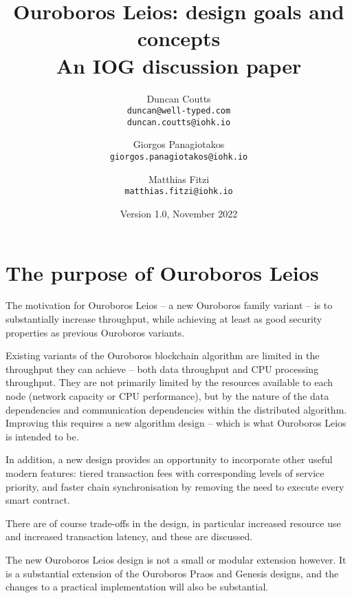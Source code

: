 \documentclass[11pt,a4paper]{article}
\begin{document}
\title{Ouroboros Leios: design goals and concepts\\
       {\large \sc An IOG discussion paper}}
\date{Version 1.0, November 2022}
\author{Duncan Coutts        \\ {\small \texttt{duncan@well-typed.com}} \\
                                {\small \texttt{duncan.coutts@iohk.io}} 
  \and  Giorgos Panagiotakos \\ {\small \texttt{giorgos.panagiotakos@iohk.io}}
  \and  Matthias Fitzi       \\ {\small \texttt{matthias.fitzi@iohk.io}}
}

\maketitle

\section*{The purpose of Ouroboros Leios}

The motivation for Ouroboros Leios -- a new Ouroboros family variant -- is to
substantially increase throughput, while achieving at least as good security
properties as previous Ouroboros variants.

Existing variants of the Ouroboros blockchain algorithm are limited in the
throughput they can achieve -- both data throughput and CPU processing
throughput. They are not primarily limited by the resources available to each
node (network capacity or CPU performance), but by the nature of the data
dependencies and communication dependencies within the distributed algorithm.
Improving this requires a new algorithm design -- which is what Ouroboros Leios
is intended to be.

In addition, a new design provides an opportunity to incorporate other useful
modern features: tiered transaction fees with corresponding levels of service
priority, and faster chain synchronisation by removing the need to execute every
smart contract.

There are of course trade-offs in the design, in particular increased resource
use and increased transaction latency, and these are discussed.

The new Ouroboros Leios design is not a small or modular extension however. It
is a substantial extension of the Ouroboros Praos and Genesis designs, and the
changes to a practical implementation will also be substantial.
\end{document}
